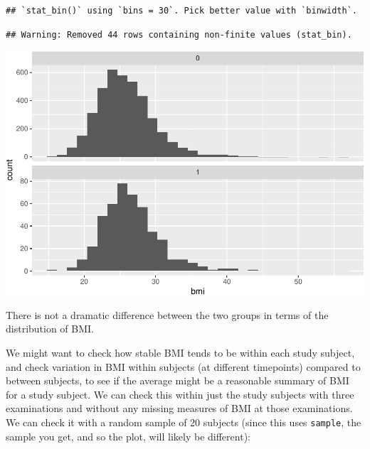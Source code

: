 \documentclass[
]{book}
\begin{document}
\begin{verbatim}
## `stat_bin()` using `bins = 30`. Pick better value with `binwidth`.
\end{verbatim}

\begin{verbatim}
## Warning: Removed 44 rows containing non-finite values (stat_bin).
\end{verbatim}

\includegraphics{adv_epi_analysis_files/figure-latex/unnamed-chunk-192-1.pdf}

There is not a dramatic difference between the two groups in terms of the distribution of BMI.

We might want to check how stable BMI tends to be within each study subject, and check variation in BMI within subjects (at different timepoints) compared to between subjects, to see if the average might be a reasonable summary of BMI for a study subject. We can check this within just the study subjects with three examinations and without any missing measures of BMI at those examinations. We can check it with a random sample of 20 subjects (since this uses \texttt{sample}, the sample you get, and so the plot, will likely be different):
\end{document}
